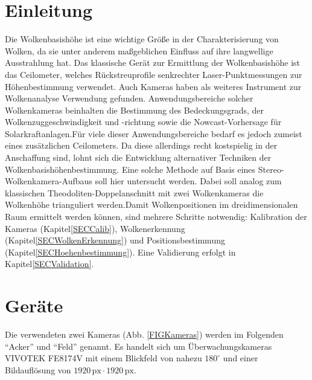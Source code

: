 \documentclass[a4paper,11pt,twoside,german]{article}
\newcommand{\absatz}{\smallbreak}
\begin{document}
\listoffigures %

\newpage


\section{Einleitung}
Die Wolkenbasishöhe ist eine wichtige Größe in der Charakterisierung von Wolken,
da sie unter anderem maßgeblichen Einfluss auf ihre langwellige Ausstrahlung
hat.  Das klassische Gerät zur Ermittlung der Wolkenbasishöhe ist das
Ceilometer, welches Rückstreuprofile senkrechter Laser-Punktmessungen zur
Höhenbestimmung verwendet.  Auch Kameras haben als weiteres Instrument zur
Wolkenanalyse Verwendung gefunden. Anwendungsbereiche solcher Wolkenkameras
beinhalten die Bestimmung des Bedeckungsgrads, der Wolkenzuggeschwindigkeit und
-richtung sowie die Nowcast-Vorhersage für Solarkraftanlagen.\absatz Für viele
dieser Anwendungsbereiche bedarf es jedoch zumeist eines zusätzlichen
Ceilometers. Da diese allerdings recht kostspielig in der Anschaffung sind,
lohnt sich die Entwicklung alternativer Techniken der
Wolkenbasishöhenbestimmung. Eine solche Methode auf Basis eines
Stereo-Wolkenkamera-Aufbaus soll hier untersucht werden.  Dabei soll analog zum
klassischen Theodoliten-Doppelanschnitt mit zwei Wolkenkameras die Wolkenhöhe
trianguliert werden.\absatz Damit Wolkenpositionen im dreidimensionalen Raum
ermittelt werden können, sind mehrere Schritte notwendig: Kalibration der
Kameras (Kapitel\;\ref{SECCalib}), Wolkenerkennung
(Kapitel\;\ref{SECWolkenErkennung}) und Positionsbestimmung
(Kapitel\;\ref{SECHoehenbestimmung}). Eine Validierung erfolgt in
Kapitel\;\ref{SECValidation}.


\section{Geräte}
\label{SECGeraete}

Die verwendeten zwei Kameras (Abb. \ref{FIGKameras}) werden im Folgenden
\enquote{Acker} und \enquote{Feld} genannt. Es handelt sich um
Überwachungskameras VIVOTEK FE8174V mit einem Blickfeld von nahezu $180^\circ$
und einer Bildauflösung von $1920\,\mathrm{px} \cdot 1920
\,\mathrm{px}$.
\absatz
\end{document}
